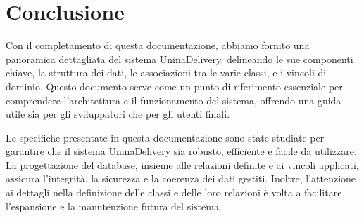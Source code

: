 \section{Conclusione}

Con il completamento di questa documentazione, abbiamo fornito una panoramica dettagliata del sistema UninaDelivery, delineando le sue componenti chiave, la struttura dei dati, le associazioni tra le varie classi, e i vincoli di dominio. Questo documento serve come un punto di riferimento essenziale per comprendere l'architettura e il funzionamento del sistema, offrendo una guida utile sia per gli sviluppatori che per gli utenti finali.

Le specifiche presentate in questa documentazione sono state studiate per garantire che il sistema UninaDelivery sia robusto, efficiente e facile da utilizzare. La progettazione del database, insieme alle relazioni definite e ai vincoli applicati, assicura l'integrità, la sicurezza e la coerenza dei dati gestiti. Inoltre, l'attenzione ai dettagli nella definizione delle classi e delle loro relazioni è volta a facilitare l'espansione e la manutenzione futura del sistema.